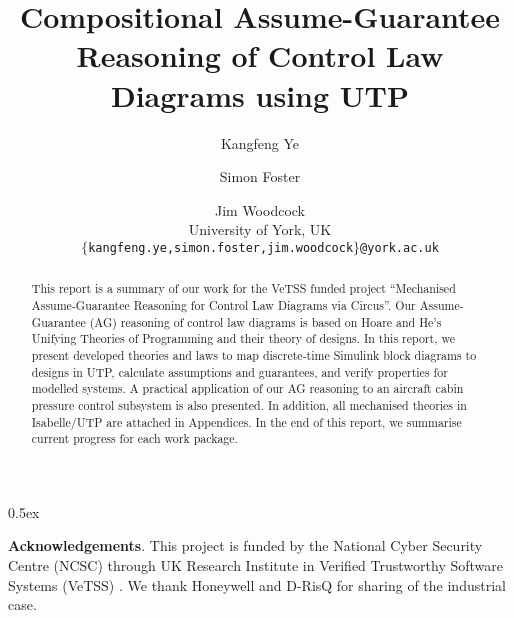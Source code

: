 \documentclass[11pt,a4paper]{article}
\begin{document}
\title{Compositional Assume-Guarantee Reasoning of Control Law Diagrams using UTP}

\author{Kangfeng Ye \and Simon Foster \and Jim Woodcock \\[.5ex] University of York, UK \\[2ex] \texttt{\small $\{$kangfeng.ye,simon.foster,jim.woodcock$\}$@york.ac.uk}}

\maketitle

\begin{abstract}
    This report is a summary of our work for the VeTSS funded project ``Mechanised Assume-Guarantee Reasoning for Control Law Diagrams via Circus''. Our Assume-Guarantee (AG) reasoning of control law diagrams is based on Hoare and He's Unifying Theories of Programming and their theory of designs. In this report, we present developed theories and laws to map discrete-time Simulink block diagrams to designs in UTP, calculate assumptions and guarantees, and verify properties for modelled systems. A practical application of our AG reasoning to an aircraft cabin pressure control subsystem is also presented. In addition, all mechanised theories in Isabelle/UTP are attached in Appendices. In the end of this report, we summarise current progress for each work package.
\end{abstract}

\tableofcontents

\parindent 0pt\parskip 0.5ex











%



\vspace{4ex}
\noindent\textbf{Acknowledgements}. This project is funded by the National Cyber Security Centre (NCSC) through UK Research Institute in Verified Trustworthy Software Systems (VeTSS) \cite{VeTSS}. We thank Honeywell and D-RisQ for sharing of the industrial case.

\appendix




\vspace{4ex}

\pagebreak 


\end{document}
